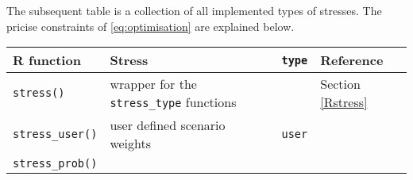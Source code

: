 \documentclass[]{article}
\begin{document}
The subsequent table is a collection of all implemented types of stresses. The pricise constraints of \eqref{eq:optimisation} are explained below.

\begin{longtable}[]{@{}llll@{}}
\toprule
\begin{minipage}[b]{0.20\columnwidth}\raggedright
R function\strut
\end{minipage} & \begin{minipage}[b]{0.39\columnwidth}\raggedright
Stress\strut
\end{minipage} & \begin{minipage}[b]{0.09\columnwidth}\raggedright
\texttt{type}\strut
\end{minipage} & \begin{minipage}[b]{0.20\columnwidth}\raggedright
Reference\strut
\end{minipage}\tabularnewline
\midrule
\endhead
\begin{minipage}[t]{0.20\columnwidth}\raggedright
\texttt{stress()}\strut
\end{minipage} & \begin{minipage}[t]{0.39\columnwidth}\raggedright
wrapper for the \texttt{stress\_type} functions\strut
\end{minipage} & \begin{minipage}[t]{0.09\columnwidth}\raggedright
\strut
\end{minipage} & \begin{minipage}[t]{0.20\columnwidth}\raggedright
Section \ref{Rstress}\strut
\end{minipage}\tabularnewline
\begin{minipage}[t]{0.20\columnwidth}\raggedright
\texttt{stress\_user()}\strut
\end{minipage} & \begin{minipage}[t]{0.39\columnwidth}\raggedright
user defined scenario weights\strut
\end{minipage} & \begin{minipage}[t]{0.09\columnwidth}\raggedright
\texttt{user}\strut
\end{minipage} & \begin{minipage}[t]{0.20\columnwidth}\raggedright
\strut
\end{minipage}\tabularnewline
\begin{minipage}[t]{0.20\columnwidth}\raggedright
\texttt{stress\_prob()}\strut
\end{minipage} & \begin{minipage}[t]{0.39\columnwidth}\raggedright

\end{minipage}
\end{longtable}
\end{document}
